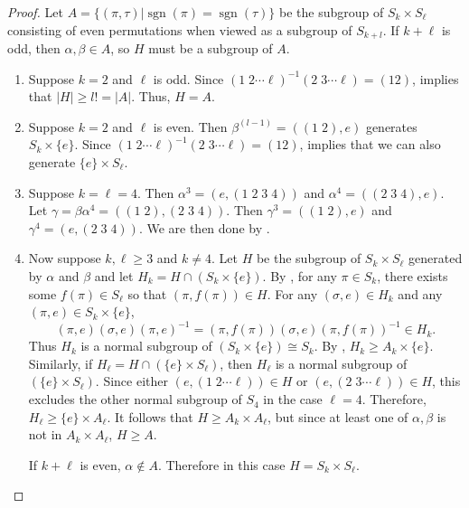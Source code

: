 \documentclass{mystyle}
\begin{document}
\begin{proof}
    Let $A = \{(\pi, \tau)| \operatorname{sgn}(\pi) = \operatorname{sgn}(\tau)\}$ be the subgroup of $S_k \times S_\ell$ consisting of even permutations when viewed as a subgroup of $S_{k + l}$. If $k + \ell$ is odd, then $\alpha, \beta \in A$, so $H$ must be a subgroup of $A$.

    \begin{enumerate}
        \item Suppose $k = 2$ and $\ell$ is odd. Since $(1 \; 2 \cdots \ell)^{-1} (2 \; 3 \cdots \ell) = (1 2)$,  implies that $|H| \geq l! = |A|$. Thus, $H = A$.
        
        \item Suppose $k = 2$ and $\ell$ is even. Then $\beta^{(l-1)} = ((1 \; 2), e)$ generates $S_k \times \{e\}$. Since $(1 \; 2 \cdots \ell)^{-1} (2 \; 3 \cdots \ell) = (1 2)$,  implies that we can also generate $\{e\} \times S_\ell$. 
        
        \item Suppose $k =\ell= 4$. Then $\alpha^{3} = (e, (1 \; 2 \; 3 \; 4))$ and $\alpha^{4} = ((2 \; 3 \; 4), e)$. Let $\gamma = \beta \alpha^4 = ((1 \; 2), (2 \; 3 \; 4))$. Then $\gamma^{3} = ((1 \; 2), e)$ and $\gamma^{4} = (e, (2 \; 3 \; 4))$. We are then done by .

        \item Now suppose $k,\ell\geq 3$ and $k \neq 4$. Let $H$ be the subgroup of $S_k \times S_\ell$ generated by $\alpha$ and $\beta$ and let $H_k = H \cap (S_k \times \{e\})$. By , for any $\pi \in S_k$, there exists some $f(\pi) \in S_\ell$ so that $(\pi, f(\pi)) \in H$. For any $(\sigma, e) \in H_k$ and any $(\pi, e) \in S_k \times \{e\}$, 
        \[
            (\pi, e) (\sigma, e) (\pi, e)^{-1} = (\pi, f(\pi)) (\sigma, e) (\pi, f(\pi))^{-1} \in H_k.
        \]
        Thus $H_k$ is a normal subgroup of $(S_k \times \{e\}) \cong S_k$. By , $H_k \geq A_k \times \{e\}$. Similarly, if $H_\ell= H \cap (\{e\} \times S_\ell)$, then $H_\ell$ is a normal subgroup of $(\{e\} \times S_\ell)$. Since either $(e, (1 \; 2 \cdots \ell)) \in H$ or $(e, (2 \; 3 \cdots \ell)) \in H$, this excludes the other normal subgroup of $S_4$ in the case $\ell = 4$. Therefore, $H_\ell\geq \{e\} \times A_\ell$. It follows that $H \geq A_k \times A_\ell$, but since at least one of $\alpha, \beta$ is not in $A_k \times A_\ell$, $H \geq A$. 
    
        If $k + \ell$ is even, $\alpha \notin A$. Therefore in this case $H = S_k \times S_\ell$.
    \end{enumerate}
\end{proof}
\end{document}

